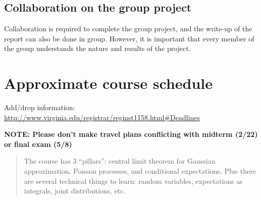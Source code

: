 \documentclass[oneside,11pt]{amsart}
\begin{document}
\subsection{Collaboration on the group project}

Collaboration is required to complete the group project,
and the write-up of the report can also be done in group. 
However, it is important that every member of the group understands the 
nature and results of the project.

\section{Approximate course schedule}

\noindent Add/drop information: \url{http://www.virginia.edu/registrar/reginst1158.html#Deadlines}
\smallskip

\noindent \textbf{NOTE: Please don't make travel plans conflicting with midterm (2/22) or final exam (5/8)}

\bigskip

\begin{quote}
	The course has 3 ``pillars'': central limit theorem for Gaussian approximation, 
	Poisson processes, and conditional expectations. 
	Plus there are several technical things to learn: random variables, expectations as integrals, 
	joint distributions, etc.
\end{quote}

\bigskip
\end{document}
